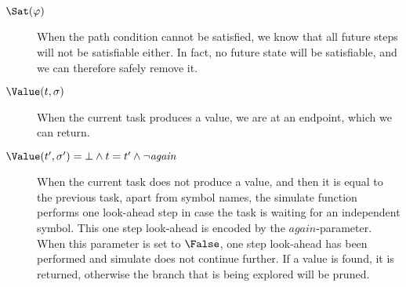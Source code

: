 \begin{description}
  \item[$\Sat(\phi)$] When the path condition cannot be satisfied, we know that all future steps will not be satisfiable either.
  In fact, no future state will be satisfiable, and we can therefore safely remove it.
  \item[$\Value(t,\sigma)$] When the current task produces a value, we are at an endpoint, which we can return.
  \item[$\Value(t',\sigma')=\bot\land t=t'\land \neg \mathit{again}$] When the current task does not produce a value, and then it is equal to the previous task, apart from symbol names, the simulate function performs one look-ahead step in case the task is waiting for an independent symbol.
  This one step look-ahead is encoded by the $\mathit{again}$-parameter. When this parameter is set to $\False$, one step look-ahead has been performed and simulate does not continue further. If a value is found, it is returned, otherwise the branch that is being explored will be pruned.
\end{description}

